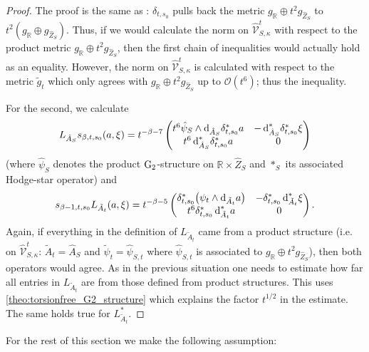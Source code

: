 \documentclass[11pt,a4paper]{scrartcl}
\newcommand*\diff{\mathop{}\!\textup{d}}
\newcommand{\G}{\textup{G}}
\numberwithin{equation}{section}
\theoremstyle{plain}
\theoremstyle{definition}
\theoremstyle{remark}
\begin{document}
\begin{proof}
The proof is the same as \cite[Proposition~7.7]{Walpuski-InstantonsKummer}: $\delta_{t,s_0}$ pulls back the metric $g_\mathbb{R}\oplus t^2 g_{\hat{Z}_S}$ to $t^2(g_\mathbb{R} \oplus g_{\hat{Z}_S})$. Thus, if we would calculate the norm on $\hat{\mathcal{V}}_{S,\kappa}^t$ with respect to the product metric $g_\mathbb{R}\oplus t^{2}g_{\hat{Z}_S}$, then the first chain of inequalities would actually hold as an equality. However, the norm on $\hat{\mathcal{V}}_{S,\kappa}^t$ is calculated with respect to the metric $\tilde{g}_t$ which only agrees with $g_\mathbb{R}\oplus t^2 g_{\hat{Z}_S}$ up to $\mathcal{O}(t^{6})$; thus the inequality.

For the second, we calculate 
\begin{align*}
L_{\hat{A}_S} s_{\beta,t,s_0} (a,\xi) = t^{-\beta-7} \begin{pmatrix}
t^6\hat{\psi}_{S} \wedge \diff_{\hat{A}_S} \delta_{t,s_0}^* a & -\diff_{\hat{A}_S}^* \delta_{t,s_0}^*\xi \\
t^6 \diff_{\hat{A}_S}^* \delta_{t,s_0}^* a & 0
\end{pmatrix}
\end{align*}
(where $\hat{\psi}_S$ denotes the product $\G_2$-structure on $\mathbb{R}\times \hat{Z}_S$ and $*_S$ its associated Hodge-star operator) and 
\begin{align*}
s_{\beta-1,t,s_0} L_{\tilde{A}_t} (a,\xi) = t^{-\beta-5} \begin{pmatrix}
\delta_{t,s_0}^* \big(\psi_t \wedge \diff_{\tilde{A}_t} a\big) & - \delta_{t,s_0}^* \diff_{\tilde{A}_t}^* \xi \\
t^6\delta_{t,s_0}^* \diff_{\tilde{A}_t}^*  a & 0
\end{pmatrix}.
\end{align*}
Again, if everything in the definition of $L_{\tilde{A}_t}$ came from a product structure (i.e. on $\hat{\mathcal{V}}_{S,\kappa}^t$: $\tilde{A}_t =\hat{A}_S$ and $\tilde{\psi}_t = \hat{\psi}_{S,t}$ where $\hat{\psi}_{S,t}$ is associated to $g_\mathbb{R}\oplus t^2 g_{\hat{Z}_S}$), then both operators would agree. As in the previous situation one needs to estimate how far all entries in $L_{\tilde{A}_t}$ are from those defined from product structures. This uses \autoref{theo:torsionfree_G2_structure} which explains the factor $t^{1/2}$ in the estimate. The same holds true for $L_{\tilde{A}_t}^*$. 
\end{proof}

For the rest of this section we make the following assumption:
\end{document}
